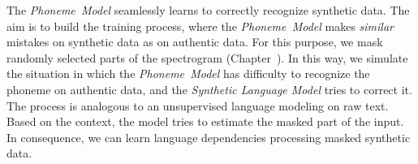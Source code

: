 The \textit{Phoneme~Model} seamlessly learns to correctly recognize synthetic data.
The aim is to build the training process, where the \textit{Phoneme~Model} makes
\textit{similar} mistakes on synthetic data as on authentic data.
For this purpose, we mask randomly selected parts of the spectrogram (Chapter~).
In this way, we simulate the situation in which the \textit{Phoneme~Model} has difficulty to recognize
the phoneme on authentic data, and the \textit{Synthetic Language Model} tries to correct it.
The process is analogous to an unsupervised language modeling on raw text.
Based on the context, the model tries to estimate the masked part of the input.
In consequence, we can learn language dependencies processing masked synthetic data.
